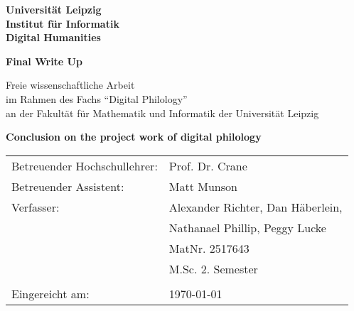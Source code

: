 \thispagestyle{empty}
\begin{center}
\textbf{\sffamily	Universität Leipzig\\
			Institut für Informatik \\
			Digital Humanities\\}
\end{center}

\begin{center}
\vspace{4cm}
{\textbf{\sffamily Final Write Up }}
\end{center}

\begin{center}
	\vspace{0.5cm}
	{\sffamily Freie wissenschaftliche Arbeit \\
			   im Rahmen des Fachs "`Digital Philology"' \\ 
	           an der Fakultät für Mathematik und Informatik der Universität
	           Leipzig  }
\end{center}


\begin{center}
	\vspace{1cm}
	\textbf{\sffamily Conclusion on the project work of digital philology }\\
	\vspace{2.5cm}
\end{center}
\vfill

\begin{center}
	{\large
	\begin{tabular}{p{7cm} l}
	
	\small Betreuender Hochschullehrer:		&\small Prof. Dr. Crane\\
	\small Betreuender Assistent: 	 		&\small Matt Munson\\
	\small Verfasser: 						&\small Alexander Richter, Dan Häberlein,  \\
											& \small Nathanael Phillip, Peggy Lucke\\
											& \small MatNr. 2517643\\
											& \small M.Sc. 2. Semester\\
											& \\
	\small Eingereicht am: 					& \small \today
	
	\end{tabular}}
\end{center}